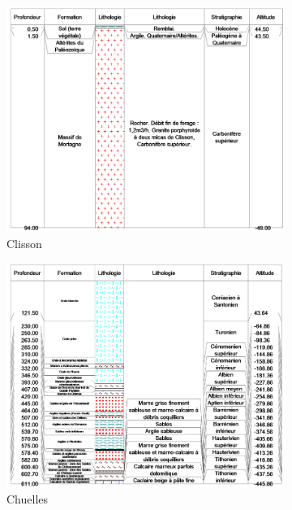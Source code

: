 \documentclass[11pt,french,a4paper]{article}
\begin{document}
\begin{figure}
\begin{subfigure}[b]{0.48\textwidth}
         \centering
         \includegraphics[width=\textwidth]{image/annexe/chap4/minees/clisson.png}
         \caption{Clisson}
     \end{subfigure}
     \begin{subfigure}[b]{0.48\textwidth}
         \centering
         \includegraphics[width=\textwidth]{image/annexe/chap4/minees/chuelles.png}
         \caption{Chuelles}
     \end{subfigure}
     \begin{subfigure}[b]{0.48\textwidth}
         \centering

\end{subfigure}
\end{figure}
\end{document}
